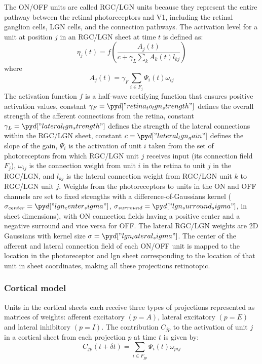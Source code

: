 \documentclass[utf8]{frontiersSCNS}
\begin{document}
The ON/OFF units are called RGC/LGN units because they represent the entire pathway between the retinal photoreceptors
and V1, including the retinal ganglion cells, LGN cells, and the connection pathways. The activation level for a unit at position $j$
in an RGC/LGN sheet at time $t$ is defined as:
\begin{equation}
\eta_{j}(t)=f\left(\frac{A_{j}(t)}{c + \gamma_{L}\sum_{k}A_{k}(t)l_{kj}}\right)
\end{equation}
\noindent where
\begin{equation}
A_{j}(t) = \gamma_{F}\sum_{i\in F_j}\Psi_{i}(t)\omega_{ij}
\end{equation}
The activation function $f$ is a half-wave rectifying function that ensures positive activation values, constant $\gamma_{F}=\insval{retina_to_lgn_strength}$ defines the overall strength of the afferent connections from the retina, constant $\gamma_{L}=\insval{lateral_lgn_strength}$ defines the strength of the lateral connections within the RGC/LGN sheet, constant $c=\insval{lateral_lgn_gain}$ defines the slope of the gain, $\Psi_{i}$ is the activation of unit $i$ taken from the set of photoreceptors
from which RGC/LGN unit $j$ receives input (its connection field $F_j$), $\omega_{ij}$ is the connection weight from unit $i$ in the
retina to unit $j$ in the RGC/LGN, and $l_{kj}$ is the lateral connection weight from RGC/LGN unit $k$ to RGC/LGN unit $j$.
Weights from the photoreceptors to units in the ON and OFF channels are set to fixed strengths with a difference-of-Gaussians
kernel ($\sigma_{center}=\insval{lgn_center_sigma}$, $\sigma_{surround}=\insval{lgn_surround_sigma}$, in sheet dimensions), with ON connection fields having a positive center and a negative surround and vice versa for OFF.  The lateral RGC/LGN weights are 2D Gaussians with kernel size $\sigma=\insval{lgn_lateral_sigma}$. The center of the afferent and lateral connection field of each ON/OFF unit is mapped to the location in the photoreceptor and lgn sheet corresponding to the location of that unit in sheet coordinates, making all these projections retinotopic.

\subsubsection{Cortical model}

Units in the cortical sheets each receive three types of projections represented as matrices of weights: afferent excitatory $(p=A)$, 
lateral excitatory $(p=E)$ and lateral inhibitory $(p=I)$.  The contribution $C_{jp}$ to the activation of unit $j$ in a cortical sheet from each projection $p$ at time $t$ is given by: 
\begin{equation} \label{eq:vm_model}
C_{jp}(t+\delta t)=\sum_{i\in F_{jp}}\Psi_{i}(t)\omega_{pij} 
\end{equation} 
\end{document}
